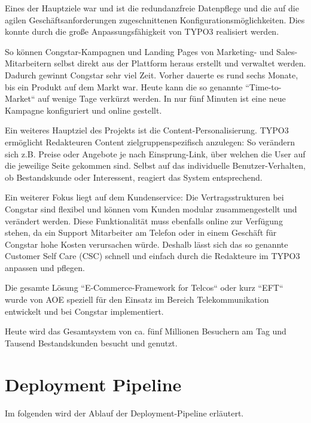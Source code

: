 \documentclass[11pt,a4paper]{article}
\begin{document}
Eines der Hauptziele war und ist die redundanzfreie Datenpflege und die auf die agilen Geschäftsanforderungen zugeschnittenen Konfigurationsmöglichkeiten. Dies konnte durch die große Anpassungsfähigkeit von TYPO3 realisiert werden.

So können Congstar-Kampagnen und Landing Pages von Marketing- und Sales-Mitarbeitern selbst direkt aus der Plattform heraus erstellt und verwaltet werden. Dadurch gewinnt Congstar sehr viel Zeit. Vorher dauerte es rund sechs Monate, bis ein Produkt auf dem Markt war. Heute kann die so genannte “Time-to-Market“ auf wenige Tage verkürzt werden. In nur fünf Minuten ist eine neue Kampagne konfiguriert und online gestellt.

Ein weiteres Hauptziel des Projekts ist die Content-Personalisierung. TYPO3 ermöglicht Redakteuren Content zielgruppenspezifisch anzulegen: So verändern sich z.B. Preise oder Angebote je nach Einsprung-Link, über welchen die User auf die jeweilige Seite gekommen sind. Selbst auf das individuelle Benutzer-Verhalten, ob Bestandskunde oder Interessent, reagiert das System entsprechend.

Ein weiterer Fokus liegt auf dem Kundenservice: Die Vertragsstrukturen bei Congstar sind flexibel und können vom Kunden modular zusammengestellt und verändert werden. Diese Funktionalität muss ebenfalls online zur Verfügung stehen, da ein Support Mitarbeiter am Telefon oder in einem Geschäft für Congstar hohe Kosten verursachen würde. Deshalb lässt sich das so genannte Customer Self Care (CSC) schnell und einfach durch die Redakteure im TYPO3 anpassen und pflegen.

Die gesamte Lösung “E-Commerce-Framework for Telcos“ oder kurz “EFT“ wurde von AOE speziell für den Einsatz im Bereich Telekommunikation entwickelt und bei Congstar implementiert.

Heute wird das Gesamtsystem von ca. fünf Millionen Besuchern am Tag und Tausend Bestandskunden besucht und genutzt.




\section{Deployment Pipeline} \label{sec:pipeline}

Im folgenden wird der Ablauf der Deployment-Pipeline erläutert.
\end{document}

